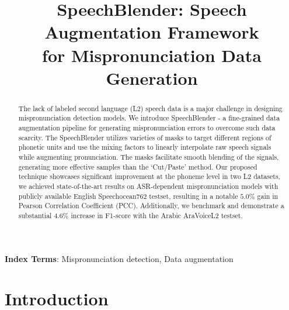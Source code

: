 \documentclass{INTERSPEECH2023}
\title{SpeechBlender: Speech Augmentation Framework \\ for Mispronunciation Data Generation}
\begin{document}
\maketitle
\begin{abstract}















The lack of labeled second language (L$2$) speech data is a major challenge in designing mispronunciation detection models. We introduce SpeechBlender - a fine-grained data augmentation pipeline for generating mispronunciation errors to overcome such data scarcity. The SpeechBlender utilizes varieties of masks to target different regions of phonetic units and use the mixing factors to linearly interpolate raw speech signals while augmenting pronunciation. The masks facilitate smooth blending of the signals, generating more effective samples than the `Cut/Paste' method. Our proposed technique showcases significant improvement at the phoneme level in two L2 datasets, we achieved state-of-the-art results on ASR-dependent mispronunciation models with publicly available English Speechocean762 testset, resulting in a notable $5.0$\% gain in Pearson Correlation Coefficient (PCC). Additionally, we benchmark and demonstrate a substantial $4.6$\% increase in F1-score with the Arabic AraVoiceL2 testset.










\end{abstract}
\noindent\textbf{Index Terms}: Mispronunciation detection, Data augmentation


\section{Introduction} 
\label{sec:intro}
\end{document}

